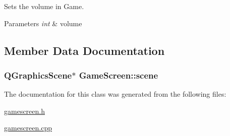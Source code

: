 Sets the volume in Game. 


\begin{DoxyParams}{Parameters}
{\em int} & volume \\
\hline
\end{DoxyParams}


\subsection{Member Data Documentation}
\hypertarget{class_game_screen_af1416b1a2647d06d0777b863be9c090e}{
\subsubsection[{scene}]{\setlength{\rightskip}{0pt plus 5cm}Q\-Graphics\-Scene$\ast$ Game\-Screen\-::scene}}\label{class_game_screen_af1416b1a2647d06d0777b863be9c090e}


The documentation for this class was generated from the following files\-:\begin{DoxyCompactItemize}
\item 
\hyperlink{gamescreen_8h}{gamescreen.\-h}\item 
\hyperlink{gamescreen_8cpp}{gamescreen.\-cpp}\end{DoxyCompactItemize}
